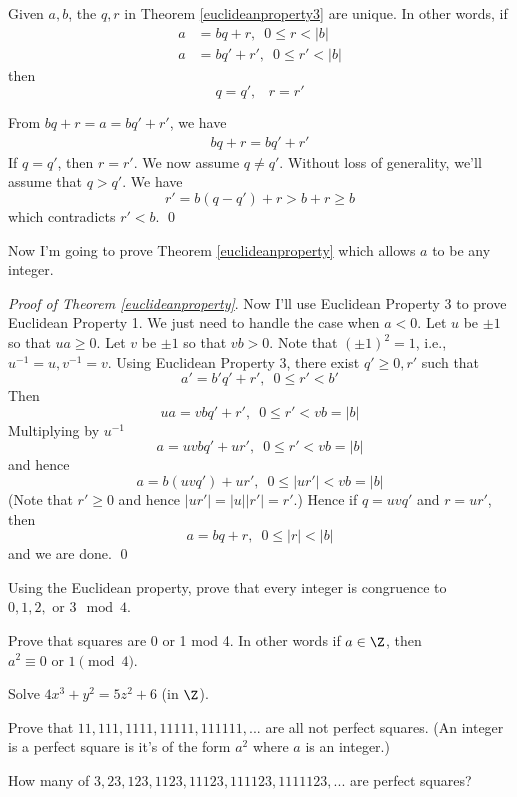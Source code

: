 \begin{prop}
  Given $a,b$, the $q,r$ in
  Theorem \ref{euclideanproperty3}
  are unique.
  In other words,
  if
  \begin{align*}
    a &= bq+r, \,\,\, 0 \leq r < |b| \\
    a &= bq'+r', \,\,\, 0 \leq r' < |b|
  \end{align*}
  then
  \[
  q=q', \,\,\,\,\, r=r'
  \]
\end{prop}

\proof
From $bq + r = a = bq' + r'$, we have
\begin{align*}
           bq + r = bq' + r'
\end{align*}
If $q = q'$, then $r = r'$.
We now assume $q \neq q'$.
Without loss of generality, we'll assume that $q > q'$.
We have
\[
r' = b(q - q') + r > b + r \geq b
\]
which contradicts $r' < b$.
\qed

Now I'm going to prove Theorem \ref{euclideanproperty}
which allows $a$ to be any integer.

\textit{Proof of Theorem \ref{euclideanproperty}}.
Now I'll use Euclidean Property 3 to prove Euclidean Property 1.
We just need to handle the case when $a < 0$.
Let $u$ be $\pm 1$ so that $ua \geq 0$.
Let $v$ be $\pm 1$ so that $vb > 0$.
Note that $(\pm 1)^2 = 1$, i.e., $u^{-1} = u, v^{-1} = v$.
Using Euclidean Property 3, there exist $q' \geq 0, r'$ such that
\[
a' = b'q' + r', \,\,\, 0 \leq r' < b'
\]
Then
\[
ua = vbq' + r', \,\,\, 0 \leq r' < vb = |b|
\]
Multiplying by $u^{-1}$
\[
a = uvbq' + ur', \,\,\, 0 \leq r' < vb = |b|
\]
and hence
\[
a = b(uvq') + ur', \,\,\, 0 \leq |ur'| < vb = |b|
\]
(Note that $r' \geq 0$ and hence $|ur'| = |u||r'| = r'$.)
Hence if $q = uvq'$ and $r = ur'$, then
\[
a = bq + r, \,\,\, 0 \leq |r| < |b|
\]
and we are done.
\qed


\begin{ex}
  Using the Euclidean property, prove that
  every integer is congruence to $0, 1, 2, \text{ or } 3 \mod{4}$.
\end{ex}

\begin{ex}
  Prove that squares are 0 or 1 mod 4. In other words
  if $a \in \Z$, then $a^2 \equiv 0 \text{ or } 1 \pmod{4}$.
\end{ex}

\begin{ex}
  Solve $4x^3 + y^2 = 5z^2 + 6$ (in $\Z$).
\end{ex}

\begin{ex}
  Prove that $11, 111, 1111, 11111, 111111, ...$ are all
  not perfect squares.
  (An integer is a perfect square is it's of the form
  $a^2$ where $a$ is an integer.)
\end{ex}

\begin{ex}
  How many of $3, 23, 123, 1123, 11123, 111123, 1111123, ...$ are
  perfect squares?
\end{ex}
